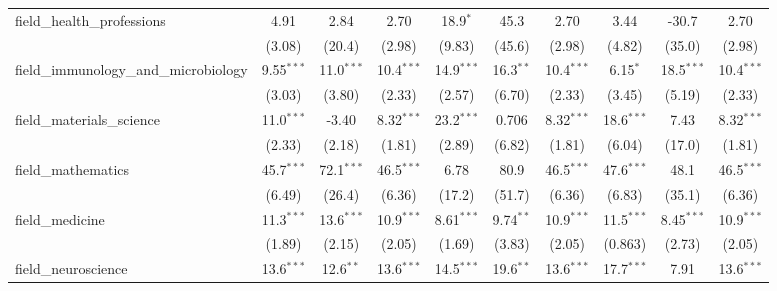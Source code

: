 \begin{tabular}{lccccccccc}
   field\_health\_professions                                  & 4.91          & 2.84          & 2.70          & 18.9$^{*}$    & 45.3           & 2.70          & 3.44          & -30.7          & 2.70\\   
                                                               & (3.08)        & (20.4)        & (2.98)        & (9.83)        & (45.6)         & (2.98)        & (4.82)        & (35.0)         & (2.98)\\   
   field\_immunology\_and\_microbiology                        & 9.55$^{***}$  & 11.0$^{***}$  & 10.4$^{***}$  & 14.9$^{***}$  & 16.3$^{**}$    & 10.4$^{***}$  & 6.15$^{*}$    & 18.5$^{***}$   & 10.4$^{***}$\\   
                                                               & (3.03)        & (3.80)        & (2.33)        & (2.57)        & (6.70)         & (2.33)        & (3.45)        & (5.19)         & (2.33)\\   
   field\_materials\_science                                   & 11.0$^{***}$  & -3.40         & 8.32$^{***}$  & 23.2$^{***}$  & 0.706          & 8.32$^{***}$  & 18.6$^{***}$  & 7.43           & 8.32$^{***}$\\   
                                                               & (2.33)        & (2.18)        & (1.81)        & (2.89)        & (6.82)         & (1.81)        & (6.04)        & (17.0)         & (1.81)\\   
   field\_mathematics                                          & 45.7$^{***}$  & 72.1$^{***}$  & 46.5$^{***}$  & 6.78          & 80.9           & 46.5$^{***}$  & 47.6$^{***}$  & 48.1           & 46.5$^{***}$\\   
                                                               & (6.49)        & (26.4)        & (6.36)        & (17.2)        & (51.7)         & (6.36)        & (6.83)        & (35.1)         & (6.36)\\   
   field\_medicine                                             & 11.3$^{***}$  & 13.6$^{***}$  & 10.9$^{***}$  & 8.61$^{***}$  & 9.74$^{**}$    & 10.9$^{***}$  & 11.5$^{***}$  & 8.45$^{***}$   & 10.9$^{***}$\\   
                                                               & (1.89)        & (2.15)        & (2.05)        & (1.69)        & (3.83)         & (2.05)        & (0.863)       & (2.73)         & (2.05)\\   
   field\_neuroscience                                         & 13.6$^{***}$  & 12.6$^{**}$   & 13.6$^{***}$  & 14.5$^{***}$  & 19.6$^{**}$    & 13.6$^{***}$  & 17.7$^{***}$  & 7.91           & 13.6$^{***}$\\   

\end{tabular}

